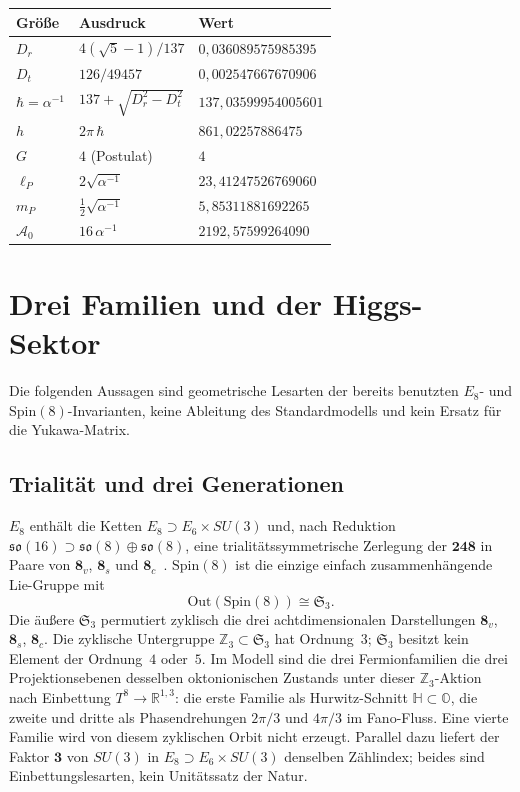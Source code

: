 \documentclass[11pt,a4paper]{article}
\begin{document}
\begin{center}
{\small
\begin{tabular}{@{}lll@{}}
\toprule
Größe & Ausdruck & Wert \\
\midrule
$D_r$ & $4(\sqrt{5}-1)/137$ & $0{,}036089575985395$ \\
$D_t$ & $126/49457$ & $0{,}002547667670906$ \\
$\hbar=\alpha^{-1}$ & $137+\sqrt{D_r^2-D_t^2}$ & $137{,}03599954005601$ \\
$h$ & $2\pi\,\hbar$ & $861{,}02257886475$ \\
$G$ & $4$ (Postulat) & $4$ \\
$\ell_P$ & $2\sqrt{\alpha^{-1}}$ & $23{,}41247526769060$ \\
$m_P$ & $\frac12\sqrt{\alpha^{-1}}$ & $5{,}85311881692265$ \\
$\mathcal{A}_0$ & $16\,\alpha^{-1}$ & $2192{,}57599264090$ \\
\bottomrule
\end{tabular}}
\end{center}

\section{Drei Familien und der Higgs-Sektor}

Die folgenden Aussagen sind geometrische Lesarten der bereits benutzten $E_8$- und $\mathrm{Spin}(8)$-Invarianten, keine Ableitung des Standardmodells und kein Ersatz für die Yukawa-Matrix.

\subsection{Trialität und drei Generationen}
$E_8$ enthält die Ketten $E_8\supset E_6\times SU(3)$ und, nach Reduktion $\mathfrak{so}(16)\supset\mathfrak{so}(8)\oplus\mathfrak{so}(8)$, eine trialitätssymmetrische Zerlegung der $\mathbf{248}$ in Paare von $\mathbf{8}_v$, $\mathbf{8}_s$ und $\mathbf{8}_c$~\cite{adams,conwaysloane}.
$\mathrm{Spin}(8)$ ist die einzige einfach zusammenhängende Lie-Gruppe mit
\begin{equation}
\mathrm{Out}(\mathrm{Spin}(8))\cong\mathfrak{S}_3.
\end{equation}
Die äußere $\mathfrak{S}_3$ permutiert zyklisch die drei achtdimensionalen Darstellungen $\mathbf{8}_v$, $\mathbf{8}_s$, $\mathbf{8}_c$.
Die zyklische Untergruppe $\mathbb{Z}_3\subset\mathfrak{S}_3$ hat Ordnung~$3$; $\mathfrak{S}_3$ besitzt kein Element der Ordnung~$4$ oder~$5$.
Im Modell sind die drei Fermionfamilien die drei Projektionsebenen desselben oktonionischen Zustands unter dieser $\mathbb{Z}_3$-Aktion nach Einbettung $T^8\to\mathbb{R}^{1,3}$:
die erste Familie als Hurwitz-Schnitt $\mathbb{H}\subset\mathbb{O}$,
die zweite und dritte als Phasendrehungen $2\pi/3$ und $4\pi/3$ im Fano-Fluss.
Eine vierte Familie wird von diesem zyklischen Orbit nicht erzeugt.
Parallel dazu liefert der Faktor $\mathbf{3}$ von $SU(3)$ in $E_8\supset E_6\times SU(3)$ denselben Zählindex; beides sind Einbettungslesarten, kein Unitätssatz der Natur.
\end{document}
